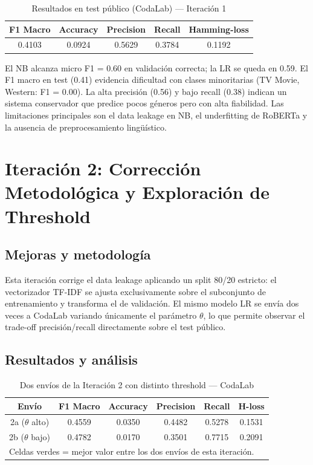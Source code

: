 \documentclass[11pt, a4paper]{article}
\begin{document}
\begin{table}[H]
\centering
\caption{Resultados en test público (CodaLab) --- Iteración 1}
\begin{tabular}{ccccc}
\toprule
\textbf{F1 Macro} & \textbf{Accuracy} & \textbf{Precision} & \textbf{Recall} & \textbf{Hamming-loss} \\
\midrule
0.4103 & 0.0924 & 0.5629 & 0.3784 & 0.1192 \\
\bottomrule
\end{tabular}
\end{table}

El NB alcanza micro F1 = 0.60 en validación correcta; la LR se queda en 0.59. El F1 macro en test (0.41) evidencia dificultad con clases minoritarias (TV Movie, Western: F1 = 0.00). La alta precisión (0.56) y bajo recall (0.38) indican un sistema conservador que predice pocos géneros pero con alta fiabilidad. Las limitaciones principales son el data leakage en NB, el underfitting de RoBERTa y la ausencia de preprocesamiento lingüístico.

\section{Iteración 2: Corrección Metodológica y Exploración de Threshold}

\subsection{Mejoras y metodología}

Esta iteración corrige el data leakage aplicando un split 80/20 estricto: el vectorizador TF-IDF se ajusta exclusivamente sobre el subconjunto de entrenamiento y transforma el de validación. El mismo modelo LR se envía dos veces a CodaLab variando únicamente el parámetro $\theta$, lo que permite observar el trade-off precisión/recall directamente sobre el test público.

\subsection{Resultados y análisis}

\begin{table}[H]
\centering
\caption{Dos envíos de la Iteración 2 con distinto threshold --- CodaLab}
\begin{tabular}{cccccc}
\toprule
\textbf{Envío} & \textbf{F1 Macro} & \textbf{Accuracy} & \textbf{Precision} & \textbf{Recall} & \textbf{H-loss} \\
\midrule
2a ($\theta$ alto) & 0.4559 & 0.0350 & 0.4482 & 0.5278 & 0.1531 \\
2b ($\theta$ bajo) & \cellcolor{bestcell}0.4782 & 0.0170 & 0.3501 & \cellcolor{bestcell}0.7715 & 0.2091 \\
\bottomrule
\multicolumn{6}{l}{\small Celdas verdes = mejor valor entre los dos envíos de esta iteración.}
\end{tabular}
\end{table}
\end{document}
